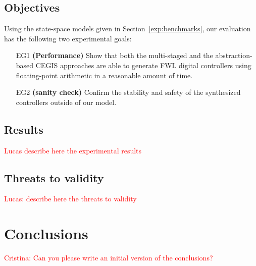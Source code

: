 \documentclass[twocolumn]{autart}    %
\newcommand{\addtodo}[1]{\textcolor{red}{[#1]}}
\begin{document}
\subsection{Objectives}
\label{exp:objectives}

Using the state-space models given in Section~\ref{exp:benchmarks}, 
our evaluation has the following two experimental goals:

\begin{enumerate}

\item[EG1] \textbf{(Performance)} Show that both the multi-staged and the abstraction-based
CEGIS approaches are able to generate FWL digital controllers using floating-point arithmetic 
in a reasonable amount of time.

\item[EG2] \textbf{(sanity check)} Confirm the
stability and safety of the synthesized controllers outside of our model.

\end{enumerate}

\subsection{Results}
\label{exp:results}

\textcolor{red}{Lucas describe here the experimental results}

\subsection{Threats to validity}
\label{exp:threats-to-validity}

\textcolor{red}{Lucas: describe here the threats to validity}

\section{Conclusions}
\label{sec:conclusions}

\textcolor{red}{Cristina: Can you please write an initial version of the conclusions?}



\end{document}
